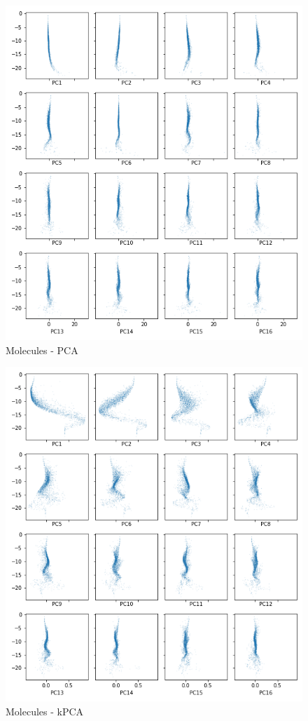 \documentclass[conference]{IEEEtran}
\begin{document}
\begin{figure}[htbp]
\centering
\includegraphics[width=\textwidth]{Molecules-PCA.png}
\caption{Molecules - PCA}
\label{fig:pca}
\end{figure}

\begin{figure}[htbp]
\centering
\includegraphics[width=\textwidth]{Molecules-kPCA.png}
\caption{Molecules - kPCA}
\label{fig:kpca}
\end{figure}
\end{document}

